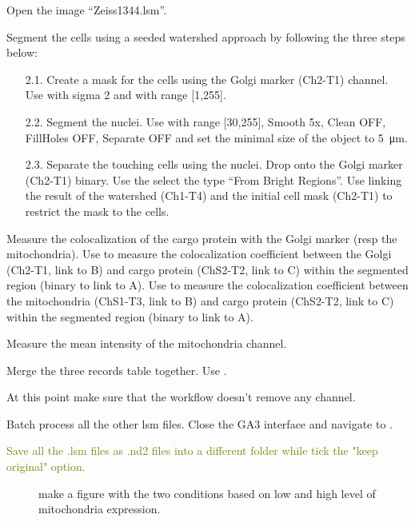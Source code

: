 \begin{enumerate}
    \item Open the image ``Zeiss1344.lsm''.
    \item Segment the cells using a seeded watershed approach by following the three steps below:
    \begin{enumerate}
        \item[2.1.] Create a mask for the cells using the Golgi marker (Ch2-T1) channel. \soln Use  with sigma 2 and  with range [1,255]. \solnend
        \item[2.2.] Segment the nuclei. \soln Use  with range [30,255], Smooth 5x, Clean OFF, FillHoles OFF, Separate OFF and set the minimal size of the object to \SI{5}{\micro\meter}. \solnend
        \item[2.3.] Separate the touching cells using the nuclei. Drop  onto the Golgi marker (Ch2-T1) binary. Use the  select the type “From Bright Regions”. Use  linking the result of the watershed (Ch1-T4) and the initial cell mask (Ch2-T1) to restrict the mask to the cells.
    \end{enumerate}
    \item Measure the colocalization of the cargo protein with the Golgi marker (resp the mitochondria). Use  to measure the colocalization coefficient between the Golgi (Ch2-T1, link to B) and cargo protein (ChS2-T2, link to C) within the segmented region (binary to link to A). Use  to measure the colocalization coefficient between the mitochondria (ChS1-T3, link to B) and cargo protein (ChS2-T2, link to C) within the segmented region (binary to link to A).
    \item Measure the mean intensity of the mitochondria channel.
    \item Merge the three records table together. \soln Use . \solnend
    \item At this point make sure that the workflow doesn’t remove any channel.
    \item Batch process all the other lsm files. Close the GA3 interface and navigate to .
    \textcolor{olive}{\item Save all the .lsm files as .nd2 files into a different folder while tick the "keep original" option.}
\end{enumerate}

\begin{description}
    \item[] make a figure with the two conditions based on low and high level of mitochondria expression.
\end{description}